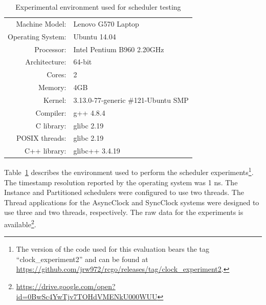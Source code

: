 \begin{table}
\center
\begin{tabular}{rl}
Machine Model:    & Lenovo G570 Laptop \\
Operating System: & Ubuntu 14.04 \\
Processor:        & Intel Pentium B960 2.20GHz \\
Architecture:     & 64-bit \\
Cores:            & 2 \\
Memory:           & 4GB \\
Kernel:           & 3.13.0-77-generic \#121-Ubuntu SMP \\
Compiler:         & g++ 4.8.4 \\
C library:        & glibc 2.19 \\
POSIX threads:    & glibc 2.19 \\
C++ library:      & glibc++ 3.4.19 \\
\end{tabular}
\caption{Experimental environment used for scheduler testing}
\label{environment}
\end{table}

Table~\ref{environment} describes the environment used to perform the scheduler experiments\footnote{The version of the code used for this evaluation bears the tag ``clock\_experiment2'' and can be found at \href{https://github.com/jrw972/rcgo/releases/tag/clock\_experiment2}{https://github.com/jrw972/rcgo/releases/tag/clock\_experiment2}.}.
The timestamp resolution reported by the operating system was 1 ns.
The Instance and Partitioned schedulers were configured to use two threads.
The Thread applications for the AsyncClock and SyncClock systems were designed to use three and two threads, respectively.
The raw data for the experiments is available\footnote{\href{https://drive.google.com/open?id=0BwSc4YwTjv7TOHdVMENkU000WUU}{https://drive.google.com/open?id=0BwSc4YwTjv7TOHdVMENkU000WUU}}.

